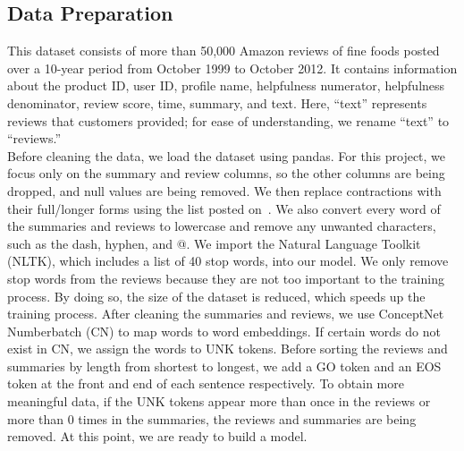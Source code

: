\documentclass[conference]{IEEEtran}
\begin{document}
\subsection{Data Preparation}
This dataset consists of more than 50,000 Amazon reviews of fine foods posted over a 10-year period from October 1999 to October 2012. It contains information about the product ID, user ID, profile name, helpfulness numerator, helpfulness denominator, review score, time, summary, and text. Here, “text” represents reviews that customers provided; for ease of understanding, we rename “text” to “reviews.” \\
\indent Before cleaning the data, we load the dataset using pandas. For this project, we focus only on the summary and review columns, so the other columns are being dropped, and null values are being removed. We then replace contractions with their full/longer forms using the list posted on~\cite{unknown1}. We also convert every word of the summaries and reviews to lowercase and remove any unwanted characters, such as the dash, hyphen, and @. We import the Natural Language Toolkit (NLTK), which includes a list of 40 stop words, into our model. We only remove stop words from the reviews because they are not too important to the training process. By doing so, the size of the dataset is reduced, which speeds up the training process. After cleaning the summaries and reviews, we use ConceptNet Numberbatch (CN) to map words to word embeddings. If certain words do not exist in CN, we assign the words to UNK tokens. Before sorting the reviews and summaries by length from shortest to longest, we add a GO token and an EOS token at the front and end of each sentence respectively. To obtain more meaningful data, if the UNK tokens appear more than once in the reviews or more than 0 times in the summaries, the reviews and summaries are being removed. At this point, we are ready to build a model.
\end{document}
